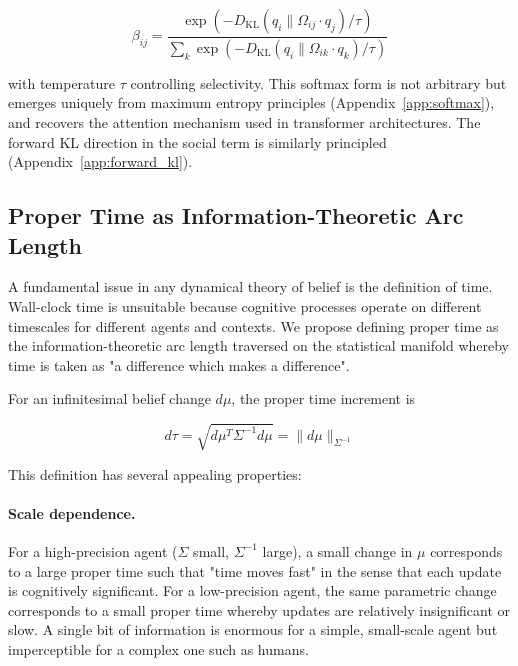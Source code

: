 \documentclass[12pt]{article}
\begin{document}
\begin{equation}
\beta_{ij} = \frac{\exp(-D_{\mathrm{KL}}(q_i \| \Omega_{ij} \cdot q_j)/\tau)}{\sum_k \exp(-D_{\mathrm{KL}}(q_i \| \Omega_{ik} \cdot q_k)/\tau)}
\label{eq:attention_weights}
\end{equation}

with temperature $\tau$ controlling selectivity. This softmax form is not arbitrary but emerges uniquely from maximum entropy principles (Appendix~\ref{app:softmax}), and recovers the attention mechanism used in transformer architectures. The forward KL direction in the social term is similarly principled (Appendix~\ref{app:forward_kl}).

\subsection{Proper Time as Information-Theoretic Arc Length}
\label{sec:proper_time}

A fundamental issue in any dynamical theory of belief is the definition of time. Wall-clock time is unsuitable because cognitive processes operate on different timescales for different agents and contexts. We propose defining proper time as the information-theoretic arc length traversed on the statistical manifold whereby time is taken as "a difference which makes a difference".

For an infinitesimal belief change $d\mu$, the proper time increment is

\begin{equation}
\boxed{d\tau = \sqrt{d\mu^T \Sigma^{-1} d\mu} = \|d\mu\|_{\Sigma^{-1}}}
\end{equation}

This definition has several appealing properties:

\paragraph{Scale dependence.} For a high-precision agent ($\Sigma$ small, $\Sigma^{-1}$ large), a small change in $\mu$ corresponds to a large proper time such that "time moves fast" in the sense that each update is cognitively significant. For a low-precision agent, the same parametric change corresponds to a small proper time whereby updates are relatively insignificant or slow. A single bit of information is enormous for a simple, small-scale agent but imperceptible for a complex one such as humans.
\end{document}
